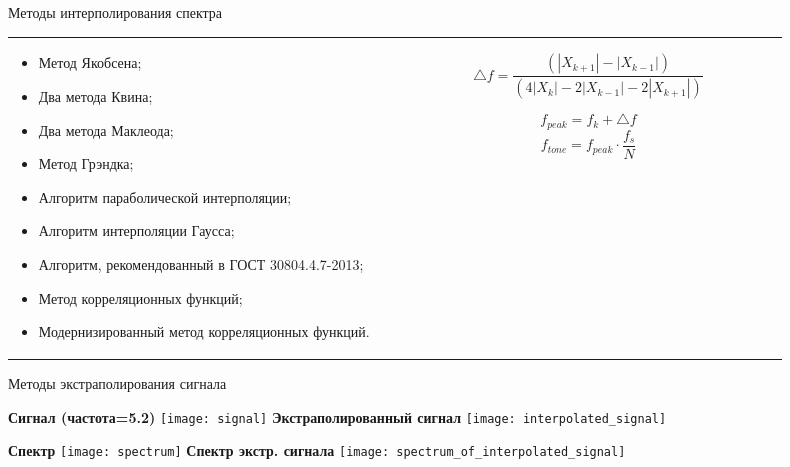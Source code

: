 \begin{frame}{Методы интерполирования спектра}
\begin{tabular}{m{0.45\linewidth}m{0.45\linewidth}}
\small{
\begin{itemize}	
	\item Метод Якобсена;
	\item Два метода Квина;
	\item Два метода Маклеода;
	\item Метод Грэндка;
	\item Алгоритм параболической интерполяции;
	\item Алгоритм интерполяции Гаусса;
	\item Алгоритм, рекомендованный в ГОСТ 30804.4.7-2013;
	\item Метод корреляционных функций;
	\item Модернизированный метод корреляционных функций.				
\end{itemize}}
&	
\begin{equation}
	\label{eq:equation2}
	\bigtriangleup f = \frac{(|X_{k+1}|-|X_{k-1}|)}{(4|X_{k}|-2|X_{k-1}|-2|X_{k+1}|)}
\end{equation}

\begin{equation}
	\label{eq:equation7}
	f_{peak} = f_k + \bigtriangleup f
\end{equation}
\begin{equation}
	\label{eq:equation8}
	f_{tone} = f_{peak} \cdot \frac{f_s}{N}
\end{equation}
\end{tabular}
\end{frame}

\begin{frame}{Методы экстраполирования сигнала}
	\begin{minipage}[t]{0.45\linewidth}
		\centering 
		\textbf{Сигнал (частота=5.2)}
		\texttt{[image: signal]}
		\textbf{Экстраполированный сигнал }
		\texttt{[image: interpolated\_signal]}		
	\end{minipage}
	\hfill
	\begin{minipage}[t]{0.45\linewidth}
		\centering 
		\textbf{Спектр}
		\texttt{[image: spectrum]}
		\textbf{Спектр экстр. сигнала}
		\texttt{[image: spectrum\_of\_interpolated\_signal]}
	\end{minipage}
\end{frame}

